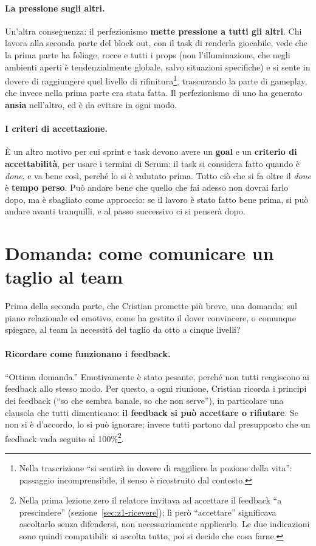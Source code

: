 \paragraph{La pressione sugli altri.} Un'altra conseguenza: il perfezionismo
\textbf{mette pressione a tutti gli altri}. Chi lavora alla seconda parte del
block out, con il task di renderla giocabile, vede che la prima parte ha
foliage, rocce e tutti i props (non l'illuminazione, che negli ambienti aperti
è tendenzialmente globale, salvo situazioni specifiche) e si sente in dovere di
raggiungere quel livello di rifinitura\footnote{Nella trascrizione ``si sentirà
in dovere di raggiliere la pozione della vita'': passaggio incomprensibile, il
senso è ricostruito dal contesto.}, trascurando la parte di gameplay, che invece
nella prima parte era stata fatta. Il perfezionismo di uno ha generato
\textbf{ansia} nell'altro, ed è da evitare in ogni modo.

\paragraph{I criteri di accettazione.} È un altro motivo per cui sprint e task
devono avere un \textbf{goal} e un \textbf{criterio di accettabilità}, per
usare i termini di Scrum: il task si considera fatto quando è \emph{done}, e va
bene così, perché lo si è valutato prima. Tutto ciò che si fa oltre il
\emph{done} è \textbf{tempo perso}. Può andare bene che quello che fai adesso
non dovrai farlo dopo, ma è sbagliato come approccio: se il lavoro è stato fatto
bene prima, si può andare avanti tranquilli, e al passo successivo ci si penserà
dopo.

\section{Domanda: come comunicare un taglio al team}
\label{sec:z3-qa-taglio}

Prima della seconda parte, che Cristian promette più breve, una domanda: sul
piano relazionale ed emotivo, come ha gestito il dover convincere, o comunque
spiegare, al team la necessità del taglio da otto a cinque livelli?

\paragraph{Ricordare come funzionano i feedback.} ``Ottima domanda.''
Emotivamente è stato pesante, perché non tutti reagiscono ai feedback allo
stesso modo. Per questo, a ogni riunione, Cristian ricorda i principi dei
feedback (``so che sembra banale, so che non serve''), in particolare una
clausola che tutti dimenticano: \textbf{il feedback si può accettare o
rifiutare}. Se non si è d'accordo, lo si può ignorare; invece tutti partono dal
presupposto che un feedback vada seguito al 100\%\footnote{Nella prima lezione
zero il relatore invitava ad accettare il feedback ``a prescindere''
(sezione~\ref{sec:z1-ricevere}); lì però ``accettare'' significava ascoltarlo
senza difendersi, non necessariamente applicarlo. Le due indicazioni sono
quindi compatibili: si ascolta tutto, poi si decide che cosa farne.}.

